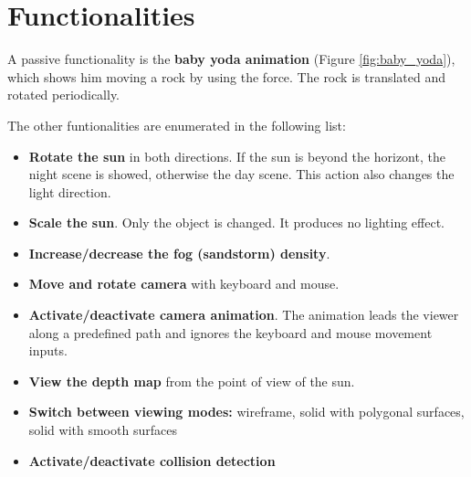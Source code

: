 \section{Functionalities} 

A passive functionality is the \textbf{baby yoda animation} (Figure \ref{fig:baby_yoda}), which shows him moving a rock by using the force. The rock is translated and rotated periodically.

The other funtionalities are enumerated in the following list:

\begin{itemize}
 \item \textbf{Rotate the sun} in both directions. If the sun is beyond the horizont, the night scene is showed, otherwise the day scene. This action also changes the light direction.
 
 \item \textbf{Scale the sun}. Only the object is changed. It produces no lighting effect.
 
 \item \textbf{Increase/decrease the fog (sandstorm) density}.
 
 \item \textbf{Move and rotate camera} with keyboard and mouse.
 
 \item \textbf{Activate/deactivate camera animation}. The animation leads the viewer along a predefined path and ignores the keyboard and mouse movement inputs.
 
 \item \textbf{View the depth map} from the point of view of the sun.
 
 \item \textbf{Switch between viewing modes:} wireframe, solid with polygonal surfaces, solid with smooth surfaces 
 
 
\item \textbf{Activate/deactivate collision detection} 
\end{itemize}

